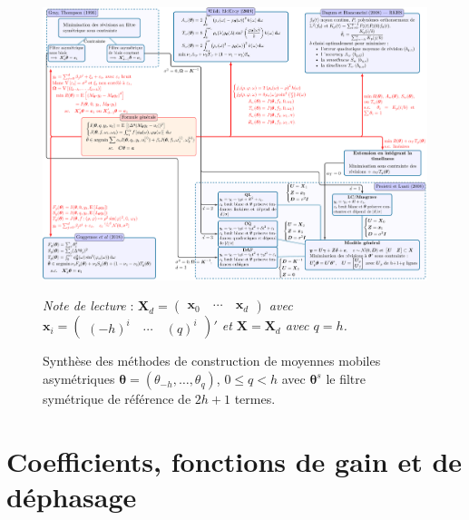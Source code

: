 \documentclass[
  12pt,
  a4paper,french]{article}
\newcommand\1{\mathds{1}}
\begin{document}
\begin{figure}[!ht]

{\centering \includegraphics[width=0.8\textheight,angle=90]{img/diagrams/diag-gen-asym-1} 

}

\caption[Synthèse des méthodes de construction de moyennes mobiles asymétriques \(\boldsymbol\theta=(\theta_{-h},\dots,\theta_{q})\), \(0\leq q< h\) avec \(\boldsymbol\theta^s\) le filtre symétrique de référence de \(2h+1\) termes]{Synthèse des méthodes de construction de moyennes mobiles asymétriques \(\boldsymbol\theta=(\theta_{-h},\dots,\theta_{q})\), \(0\leq q< h\) avec \(\boldsymbol\theta^s\) le filtre symétrique de référence de \(2h+1\) termes.}\label{fig:diag-gen-asym-fig}

\footnotesize


\emph{Note de lecture} : \emph{\(\boldsymbol X_d = \begin{pmatrix} \boldsymbol x_0 \quad\cdots \quad \boldsymbol x_d \end{pmatrix}\) avec \(\boldsymbol x_i=\begin{pmatrix} (-h)^i \quad \cdots \quad (q)^i\end{pmatrix}'\) et \(\boldsymbol X=\boldsymbol X_d\) avec \(q=h\).}
\normalsize\end{figure}

\newpage

\hypertarget{an-graphs}{%
\section{Coefficients, fonctions de gain et de déphasage}\label{an-graphs}}
\end{document}
